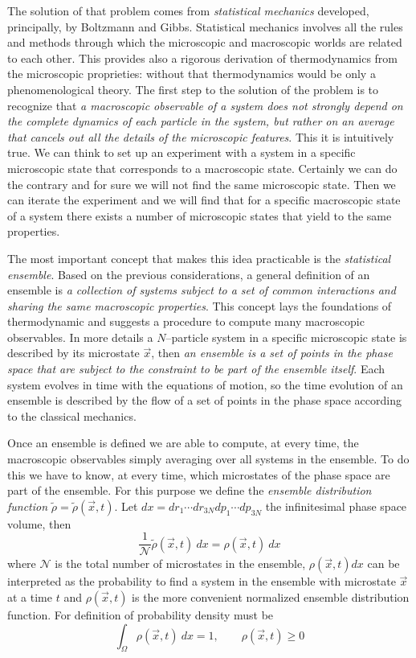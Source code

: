 The solution of that problem comes from \textit{statistical mechanics} developed, principally, by Boltzmann and
Gibbs. Statistical mechanics involves all the rules and methods through which the microscopic and macroscopic
worlds are related to each other. This provides also a rigorous derivation of thermodynamics from the microscopic
proprieties: without that thermodynamics would be only a phenomenological theory. The first step to the solution
of the problem is to recognize that \textit{a macroscopic observable of a system does not strongly depend on the
complete dynamics of each particle in the system, but rather on an average that cancels out all the details of
the microscopic features}. This it is intuitively true. We can think to set up an experiment with a system in a
specific microscopic state that corresponds to a macroscopic state. Certainly we can do the contrary and for sure
we will not find the same microscopic state. Then we can iterate the experiment and we will find that for a
specific macroscopic state of a system there exists a number of microscopic states that yield to the same
properties.

The most important concept that makes this idea practicable is the \textit{statistical ensemble}. Based on the
previous considerations, a general definition of an ensemble is \textit{a collection of systems subject to a set
of common interactions and sharing the same macroscopic properties}. This concept lays the foundations of
thermodynamic and suggests a procedure to compute many macroscopic observables. In more details a
$N$--particle system in a specific microscopic state is described by its microstate $\vec x$, then \textit{an
ensemble is a set of points in the phase space that are subject to the constraint to be part of the ensemble
itself}. Each system evolves in time with the equations of motion, so the time evolution of an ensemble is
described by the flow of a set of points in the phase space according to the classical mechanics.

Once an ensemble is defined we are able to compute, at every time, the macroscopic observables simply averaging
over all systems in the ensemble. To do this we have to know, at every time, which microstates of the phase space
are part of the ensemble. For this purpose we define the \textit{ensemble distribution function}
$\tilde\rho = \tilde\rho(\vec x,t)$. Let $dx = dr_1\cdots dr_{3N} dp_1 \cdots dp_{3N}$ the infinitesimal phase
space volume, then
\begin{equation*}
	\frac{1}{\mathcal{N}}\tilde\rho(\vec x, t)\ dx = \rho(\vec x, t)\ dx
\end{equation*}
where $\mathcal{N}$ is the total number of microstates in the ensemble, $\rho(\vec x, t)dx$ can be interpreted as
the probability to find a system in the ensemble with microstate $\vec x$ at a time $t$ and $\rho(\vec x, t)$ is
the more convenient normalized ensemble distribution function. For definition of probability density must be
\begin{equation*}
	\int_{\Omega} \rho(\vec x, t)\ dx = 1, \qquad \rho(\vec x, t) \ge 0
\end{equation*}

